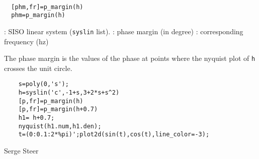 \begin{mandesc}
   \\ %
\end{mandesc}
\begin{calling_sequence}
\begin{verbatim}
  [phm,fr]=p_margin(h)  
  phm=p_margin(h)  
\end{verbatim}
\end{calling_sequence}
\begin{parameters}
  \begin{varlist}
    : SISO linear system (\verb!syslin! list).
    : phase margin (in degree)
    : corresponding frequency (hz)
  \end{varlist}
\end{parameters}
\begin{mandescription}
  The phase margin is the values of the phase at points where the
  nyquist plot of \verb!h! crosses the unit circle.
\end{mandescription}
\begin{examples}
  \begin{Verbatim}
    s=poly(0,'s');
    h=syslin('c',-1+s,3+2*s+s^2)  
    [p,fr]=p_margin(h)  
    [p,fr]=p_margin(h+0.7)  
    h1= h+0.7;
    nyquist(h1.num,h1.den);
    t=(0:0.1:2*%pi)';plot2d(sin(t),cos(t),line_color=-3);
  \end{Verbatim}
\end{examples}
\begin{manseealso}
    
     
\end{manseealso}
\begin{authors}
  Serge Steer
\end{authors}
